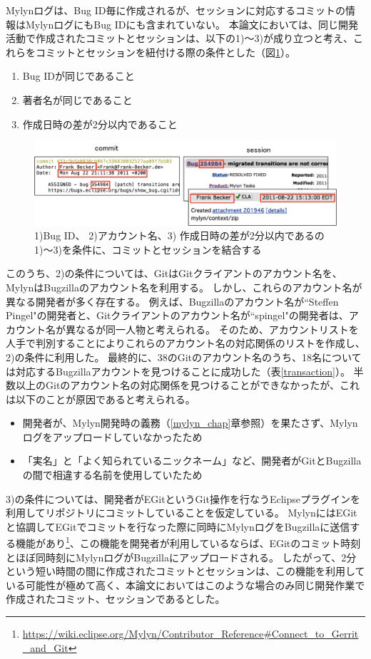 \documentclass[a4paper]{jsbook}
\begin{document}
Mylynログは、Bug ID毎に作成されるが、セッションに対応するコミットの情報はMylynログにもBug IDにも含まれていない。
本論文においては、同じ開発活動で作成されたコミットとセッションは、以下の1)〜3)が成り立つと考え、これらをコミットとセッションを紐付ける際の条件とした（図\ref{concat_figure}）。
\begin{enumerate}
  \item Bug IDが同じであること
  \item 著者名が同じであること
  \item 作成日時の差が2分以内であること
\end{enumerate}
\begin{figure}[tb]
  \centering
  \includegraphics[width = \linewidth]{resource/concatenating.pdf}
  \caption{1)Bug ID、 2)アカウント名、3) 作成日時の差が2分以内であるの1)〜3)を条件に、コミットとセッションを結合する}
  \label{concat_figure}
\end{figure}
このうち、2)の条件については、GitはGitクライアントのアカウント名を、MylynはBugzillaのアカウント名を利用する。
しかし、これらのアカウント名が異なる開発者が多く存在する。
例えば、Bugzillaのアカウント名が``Steffen Pingel"の開発者と、Gitクライアントのアカウント名が``spingel"の開発者は、アカウント名が異なるが同一人物と考えられる。
そのため、アカウントリストを人手で判別することによりこれらのアカウント名の対応関係のリストを作成し、2)の条件に利用した。
最終的に、38のGitのアカウント名のうち、18名については対応するBugzillaアカウントを見つけることに成功した（表\ref{transaction}）。
半数以上のGitのアカウント名の対応関係を見つけることができなかったが、これは以下のことが原因であると考えられる。
\begin{itemize}
  \item 開発者が、Mylyn開発時の義務（\ref{mylyn_chap}章参照）を果たさず、Mylynログをアップロードしていなかったため
  \item 「実名」と「よく知られているニックネーム」など、開発者がGitとBugzillaの間で相違する名前を使用していたため
\end{itemize}

3)の条件については、開発者がEGitというGit操作を行なうEclipseプラグインを利用してリポジトリにコミットしていることを仮定している。
MylynにはEGitと協調してEGitでコミットを行なった際に同時にMylynログをBugzillaに送信する機能があり\footnote{\url{https://wiki.eclipse.org/Mylyn/Contributor_Reference\#Connect_to_Gerrit_and_Git}}、この機能を開発者が利用しているならば、EGitのコミット時刻とほぼ同時刻にMylynログがBugzillaにアップロードされる。
したがって、2分という短い時間の間に作成されたコミットとセッションは、この機能を利用している可能性が極めて高く、本論文においてはこのような場合のみ同じ開発作業で作成されたコミット、セッションであるとした。
\end{document}
